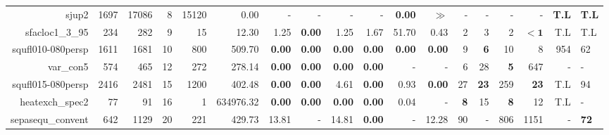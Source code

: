 \begin{table*}[t]
\begin{tabular}{|r|r|r|r|r||r||r|r|r|r|r||r|r|r|r|r|r|}
                             sjup2 &         1697 &         17086 &            8 &         15120 &                0.00 &              - &              - &             - &              - & \textbf{0.00} &         $\gg$ &                  - &                  - &                  - &                  - & \textbf{T.L} & \textbf{T.L} \\ 
                   sfacloc1\_3\_95 &          234 &           282 &            9 &            15 &               12.30 &           1.25 &  \textbf{0.00} &          1.25 &           1.67 &         51.70 &          0.43 &                  2 &                  3 &                  2 &         $\bm{< 1}$ &          T.L &          T.L \\ 
                 squfl010-080persp &         1611 &          1681 &           10 &           800 &              509.70 &  \textbf{0.00} &  \textbf{0.00} & \textbf{0.00} &  \textbf{0.00} & \textbf{0.00} & \textbf{0.00} &                  9 &         \textbf{6} &                 10 &                  8 &          954 &           62 \\ 
                         var\_con5 &          574 &           465 &           12 &           272 &              278.14 &  \textbf{0.00} &  \textbf{0.00} & \textbf{0.00} &  \textbf{0.00} &             - &             - &                  6 &                 28 &         \textbf{5} &                647 &            - &            - \\ 
                 squfl015-080persp &         2416 &          2481 &           15 &          1200 &              402.48 &  \textbf{0.00} &  \textbf{0.00} &          4.61 &  \textbf{0.00} &          0.93 & \textbf{0.00} &                 27 &        \textbf{23} &                259 &        \textbf{23} &          T.L &           94 \\ 
                   heatexch\_spec2 &           77 &            91 &           16 &             1 &           634976.32 &  \textbf{0.00} &  \textbf{0.00} & \textbf{0.00} &  \textbf{0.00} &          0.04 &             - &         \textbf{8} &                 15 &         \textbf{8} &                 12 &          T.L &            - \\ 
                 sepasequ\_convent &          642 &          1129 &           20 &           221 &              429.73 &          13.81 &              - &         14.81 &  \textbf{0.00} &             - &         12.28 &                 90 &                  - &                806 &               1151 &            - &  \textbf{72} \\ 

\end{tabular}
\end{table*}
